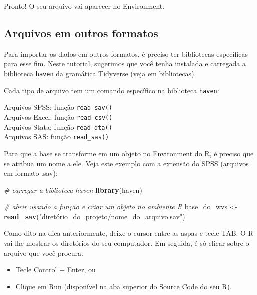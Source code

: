 \documentclass[
  10pt,
  brazil,
  a4paper,
  twoside, notitlepage, openright]{book}
\newenvironment{Shaded}{\begin{snugshade}}{\end{snugshade}}
\newcommand{\CommentTok}[1]{\textcolor[rgb]{0.56,0.35,0.01}{\textit{#1}}}
\newcommand{\KeywordTok}[1]{\textcolor[rgb]{0.13,0.29,0.53}{\textbf{#1}}}
\newcommand{\NormalTok}[1]{#1}
\newcommand{\StringTok}[1]{\textcolor[rgb]{0.31,0.60,0.02}{#1}}
\providecommand{\tightlist}{%
  \setlength{\itemsep}{0pt}\setlength{\parskip}{0pt}}
\begin{document}
Pronto! O seu arquivo vai aparecer no Environment.

\hypertarget{arquivos-em-outros-formatos-1}{%
\subsection{Arquivos em outros formatos}\label{arquivos-em-outros-formatos-1}}

Para importar os dados em outros formatos, é preciso ter bibliotecas específicas para esse fim. Neste tutorial, sugerimos que você tenha instalada e carregada a biblioteca \texttt{haven} da gramática Tidyverse (veja em \protect\hyperlink{biblio}{bibliotecas}).

Cada tipo de arquivo tem um comando específico na biblioteca \texttt{haven}:

Arquivos SPSS: função \texttt{read\_sav()}\\
Arquivos Excel: função \texttt{read\_csv()}\\
Arquivos Stata: função \texttt{read\_dta()}\\
Arquivos SAS: função \texttt{read\_sas()}

Para que a base se transforme em um objeto no Environment do R, é preciso que se atribua um nome a ele. Veja este exemplo com a extensão do SPSS (arquivos em formato .sav):

\begin{Shaded}
\begin{Highlighting}[]
\CommentTok{# carregar a biblioteca haven}
\KeywordTok{library}\NormalTok{(haven)}

\CommentTok{# abrir usando a função e criar um objeto no ambiente R}
\NormalTok{base_do_wvs <-}\StringTok{ }\KeywordTok{read_sav}\NormalTok{(}\StringTok{"diretório_do_projeto/nome_do_arquivo.sav"}\NormalTok{)}
\end{Highlighting}
\end{Shaded}

Como dito na dica anteriormente, deixe o cursor entre as aspas e tecle TAB. O R vai lhe mostrar os diretórios do seu computador. Em seguida, é só clicar sobre o arquivo que você procura.

\begin{itemize}
\tightlist
\item
  Tecle Control + Enter, ou\\
\item
  Clique em Run (disponível na aba superior do Source Code do seu R).
\end{itemize}
\end{document}
